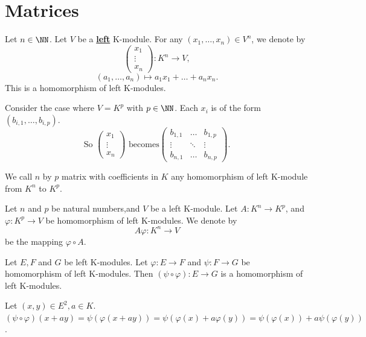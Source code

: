 \section{Matrices}
\begin{definitionenv}
    Let $n\in \NN$. Let $V$ be a \underline{\textbf{left}} K-module. For any $(x_1, \dots, x_n)\in V^n$,  we denote by 
    $$\begin{pmatrix}
x_1 \\
 \vdots \\
x_n
\end{pmatrix}
:
K^n\longrightarrow V, $$
$$(a_1, \dots, a_n)\longmapsto a_1x_1+\dots+a_nx_n. $$
This is a homomorphism of left K-modules.
\end{definitionenv}
\begin{exampleenv}
    Consider the case where $V=K^p$ with $p\in \NN$. Each $x_i$ is of the form $(b_{i, 1}, \dots, b_{i, p})$.
    $$\text{So } \begin{pmatrix}
x_1 \\
 \vdots \\
x_n
\end{pmatrix}
\text{ becomes}
\begin{pmatrix}
  b_{1, 1}& \dots  &b_{1, p} \\
  \vdots & \ddots  & \vdots \\
  b_{n, 1}& \dots &b_{n, p}
\end{pmatrix} .$$
\end{exampleenv}
\begin{definitionenv}
    We call $n$ by $p$ matrix with coefficients in $K$ any homomorphism of left K-module from $K^n$ to $K^p$.
\end{definitionenv}
\begin{definitionenv}
    Let $n$ and $p$ be natural numbers,and $V$ be a left K-module. Let $A:K^n\rightarrow K^p$, and $\varphi:K^p\rightarrow V$ be homomorphism of left K-modules. We denote by 
    $$A\varphi:K^n\longrightarrow V $$
    be the mapping $\varphi\circ A.$
\end{definitionenv}
\begin{propositionenv}
    Let $E,F$ and $G$ be left K-modules. Let $\varphi:E\rightarrow F$ and $\psi:F\rightarrow G$ be homomorphism of left K-modules. Then $(\psi\circ \varphi):E\rightarrow G$ is a homomorphism of left K-modules.
\end{propositionenv}
\begin{proofenv}
    Let $(x,y)\in E^2, a\in K$. $(\psi\circ\varphi)(x+ay)=\psi(\varphi(x+ay))=\psi(\varphi(x)+a\varphi(y))=\psi(\varphi(x))+a\psi(\varphi(y))$.
\end{proofenv}


